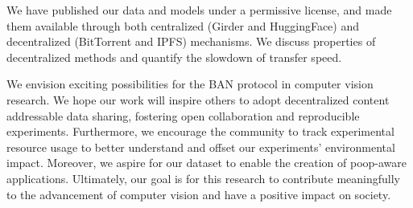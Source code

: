 \documentclass{article}
\newif\ifnonanonymous
\newif\ifuseappendix
\newif\ifuseacknowledgement
\begin{document}
We have published our data and models under a permissive license, and made them available through both
  centralized (Girder and HuggingFace) and decentralized (BitTorrent and IPFS) mechanisms.
We discuss properties of decentralized methods and quantify the slowdown of transfer speed.




We envision exciting possibilities for the BAN protocol in computer vision research.
We hope our work will inspire others to adopt decentralized content addressable data sharing, fostering open
  collaboration and reproducible experiments.
Furthermore, we encourage the community to track experimental resource usage to better understand and offset
  our experiments' environmental impact.
Moreover, we aspire for our dataset to enable the creation of poop-aware applications.
Ultimately, our goal is for this research to contribute meaningfully to the advancement of computer vision
  and have a positive impact on society.
  
  
\ifnonanonymous
\ifuseacknowledgement
\section{Acknowledgements}
We would would like to thank all of the dogs that produced subject matter for the dataset, all of the
  contributors for helping to construct a challenging test set, and Anthony Hoogs for several suggestions including taking the 
  third negative picture.

\fi
\fi

{\small


}


\ifuseappendix


\fi
\end{document}
